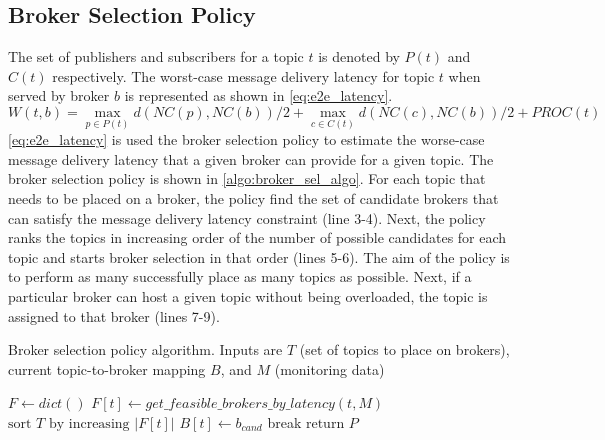 \subsection{Broker Selection Policy}
The set of publishers and subscribers for a topic $t$ is denoted by $P \left( t \right)$ and $C \left( t \right)$ respectively. The worst-case message delivery latency for topic $t$ when served by broker $b$ is represented as shown in \cref{eq:e2e_latency}.
\begin{equation}
W\left( t, b \right) = \max\limits_{p \in P\left( t \right)} d \left( NC \left( p\right), NC \left( b\right) \right)/2 + \max\limits_{c \in C\left( t \right)} d \left( NC \left( c\right), NC \left( b\right)\right)/2 + PROC \left( t \right)
\label{eq:e2e_latency}
\end{equation}
\cref{eq:e2e_latency} is used the broker selection policy to estimate the worse-case message delivery latency that a given broker can provide for a given topic. The broker selection policy is shown in \cref{algo:broker_sel_algo}. For each topic that needs to be placed on a broker, the policy find the set of candidate brokers that can satisfy the message delivery latency constraint (line 3-4). Next, the policy ranks the topics in increasing order of the number of possible candidates for each topic and starts broker selection in that order (lines 5-6). The aim of the policy is to perform as many successfully place as many topics as possible. Next, if a particular broker can host a given topic without being overloaded, the topic is assigned to that broker (lines 7-9). 
\begin{algorithm}
\caption{Broker selection policy algorithm. Inputs are $T$ (set of topics to place on brokers), current topic-to-broker mapping $B$, and $M$ (monitoring data)}\label{algo:broker_sel_algo}
\begin{algorithmic}[1]
\State $F \gets dict\left(\right)$
    \State $F \left[ t \right] \gets get\_feasible\_brokers\_by\_latency \left( t , M\right)$
\EndFor
\State $\text{sort } T \text{ by increasing } |F \left[ t \right]|$
         
            \State $B \left[ t \right] \gets b_{cand}$
            \State break
        \EndIf
    \EndFor
\EndFor
\State $\text{return } P$
\EndProcedure
\end{algorithmic}
\end{algorithm}

